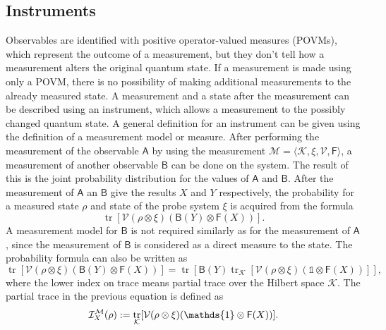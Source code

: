 \documentclass[a4paper,12pt]{wihuri}
\theoremstyle{definition}
\numberwithin{definition}{section}
\numberwithin{example}{section}
\numberwithin{theorem}{section}
\numberwithin{proposition}{section}
\numberwithin{lemma}{section}
\newcommand{\I}{\mathcal{I}}%
\newcommand{\ins}{\I_X^{\mm}}%
\newcommand{\ki}{\mathcal{K}}%
\newcommand{\mm}{\mathcal{M}}%
\newcommand{\V}{\mathcal{V}}%
\newcommand{\A}{\mathsf{A}}%
\newcommand{\B}{\mathsf{B}}%
\newcommand{\F}{\mathsf{F}}%
\newcommand{\id}{\mathds{1}}
\DeclareMathOperator{\tr}{tr}
\begin{document}
\subsection{Instruments}
Observables are identified with positive operator-valued measures (POVMs), which represent the outcome of a measurement, but they don't tell how a measurement alters the original quantum state. If a measurement is made using only a POVM, there is no possibility of making additional measurements to the already measured state. A measurement and a state after the measurement can be described using an instrument, which allows a measurement to the possibly changed quantum state.
A general definition for an instrument can be given using the definition of a measurement model or measure. After performing the measurement of the observable $\A$ by using the measurement $\mm = \langle \ki, \xi, \V, \F \rangle$, a measurement of another observable $\B$ can be done on the system. The result of this is the joint probability distribution for the values of $\A$ and $\B$. After the measurement of $\A$ an $\B$ give the results $X$ and $Y$ respectively, the probability for a measured state $\rho$ and state of the probe system $\xi$ is acquired from the formula
\begin{equation}
\tr[\V(\rho \otimes \xi)(\B(Y)\otimes \F(X))]\mathrm{.}
\end{equation}
A measurement model for $\B$ is not required similarly as for the measurement of $\A$, since the measurement of $\B$ is considered as a direct measure to the state. The probability formula can also be written as
\begin{equation*}
\tr[\V(\rho \otimes \xi)(\B(Y)\otimes \F(X))] = \tr[\B(Y)\tr_{\ki}[\V(\rho \otimes \xi)(\id \otimes \F(X))]],
\end{equation*}
where the lower index on trace means partial trace over the Hilbert space $\ki$. The partial trace in the previous equation is defined as 
\begin{equation}
\ins(\rho) := \tr_{\ki}[\V(\rho \otimes \xi)(\id \otimes \F(X))]\text.
\end{equation}
\end{document}
